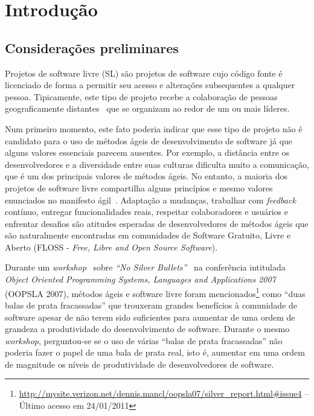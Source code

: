 \chapter{Introdução}
\label{cap:introducao}

\section{Considerações preliminares}
\label{sec:consideracoes_preliminares}

Projetos de software livre (SL) são projetos de software cujo código
fonte é licenciado de forma a permitir seu acesso e alterações
subsequentes a qualquer pessoa. Tipicamente, este tipo de projeto
recebe a colaboração de pessoas geograficamente
distantes~\cite{Dempsey1999} que se organizam ao redor de um ou mais
líderes.

Num primeiro momento, este fato poderia indicar que esse tipo de
projeto não é candidato para o uso de métodos ágeis de desenvolvimento
de software já que alguns valores essenciais parecem ausentes. Por
exemplo, a distância entre os desenvolvedores e a diversidade entre
suas culturas dificulta muito a comunicação, que é um dos principais
valores de métodos ágeis. No entanto, a maioria dos projetos de
software livre compartilha alguns princípios e mesmo valores
enunciados no manifesto ágil~\cite{AgileManifesto}. Adaptação a
mudanças, trabalhar com \emph{feedback} contínuo, entregar
funcionalidades reais, respeitar colaboradores e usuários e enfrentar
desafios são atitudes esperadas de desenvolvedores de métodos ágeis
que são naturalmente encontradas em comunidades de Software Gratuito,
Livre e Aberto (FLOSS - \emph{Free, Libre and Open Source Software}).

Durante um \emph{workshop}~\cite{OOPSLA07} sobre \emph{``No Silver
  Bullets''}~\cite{Brooks1987} na conferência intitulada \emph{Object
  Oriented Programming Systems, Languages and Applications 2007}
(OOPSLA 2007), métodos ágeis e software livre foram
mencionados\footnote{\url{http://mysite.verizon.net/dennis.mancl/oopsla07/silver_report.html\#issue4}
  -- Último acesso em 24/01/2011} como ``duas balas de prata
fracassadas'' que trouxeram grandes benefícios à comunidade de
software apesar de não terem sido suficientes para aumentar de uma
ordem de grandeza a produtividade do desenvolvimento de
software. Durante o mesmo \emph{workshop}, perguntou-se se o uso de
várias ``balas de prata fracassadas'' não poderia fazer o papel de uma
bala de prata real, isto é, aumentar em uma ordem de magnitude os
níveis de produtividade de desenvolvedores de software.

